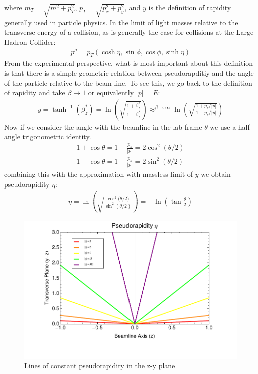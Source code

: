 where $m_T = \sqrt{m^2 + p_T^2}$, $p_T = \sqrt{ p_x^2 + p_y^2}$, and $y$ is the definition of rapidity generally used in particle
physics. In the limit of light masses relative to the  transverse energy of a collision, as is generally
 the case for collisions at the Large Hadron Collider:
\begin{align*}
p^\mu = p_T(\cosh \eta , \sin \phi, \cos \phi, \sinh \eta)
\end{align*}
From the experimental perspective, what is most important about this definition is that there is a simple geometric relation
between pseudorapditiy and the angle of the particle relative to the beam line. To see this, we go back to the definition
of rapidity and take $\beta\rightarrow 1$ or equivalently $|p|=E$:
\begin{align*}
y = \tanh^{-1} ( \beta_z^* ) = \ln \left ( \sqrt{\frac{1+\beta_z^*}{1-\beta_z^*}  }\right ) \approx^{\beta\rightarrow\infty} \ln \left ( \sqrt{\frac{1+p_z/|p|}{1-p_z/|p|}  }\right )
\end{align*}
Now if we consider the angle with the beamline in the lab frame $\theta$ we use a half angle trigonometric identity.
\begin{align*}
1+ \cos \theta = 1 +\frac{p_z}{|p|} = 2 \cos^2 (\theta / 2) \\ 
1- \cos \theta = 1 -\frac{p_z}{|p|} = 2 \sin^2 (\theta / 2)
\end{align*}
combining this with the approximation with massless limit of $y$ we obtain pseudorapidity $\eta$:
\begin{align*}
\eta = \ln \left ( \sqrt{\frac{\cos^2{(\theta/2})}{\sin^{2}{(\theta/2)} }}  \right) = - \ln \left ( \tan \frac{\theta}{2} \right )
\end{align*}
\begin{figure}
\begin{center}
\includegraphics[width=.6\textwidth]{figures/exp_proj/pseudorapidity}
\end{center}
\caption{Lines of constant pseudorapidity in the z-y plane}
\label{fig:pseudorapidity}
\end{figure}
